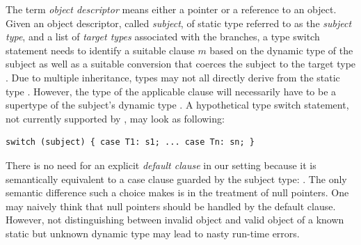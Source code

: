The term \emph{object descriptor} means either a pointer or a reference to 
an object.
Given an object descriptor, called \emph{subject}, of static type  
referred to as the \emph{subject type}, and a list of 
\emph{target types}  associated with the branches, a type switch 
statement needs to identify a suitable clause $m$ based on 
the dynamic type  of the subject as well as a suitable 
conversion that coerces the subject to the target type .  
Due to multiple inheritance, types  may not all directly
derive from the static type . However,
the type of the applicable clause  will necessarily have to be a 
supertype of the subject's dynamic type . 
A hypothetical type switch 
statement, not currently supported by \Cpp{}, may look as following:
%
\begin{lstlisting}[keepspaces]
switch (subject) { case T1: s1; ... case Tn: sn; }
\end{lstlisting}
%
\noindent
There is no need for an explicit \emph{default clause} in our setting because 
it is semantically equivalent to a case clause guarded by the 
subject type: . The only semantic difference such a choice 
makes is in the treatment of null pointers.
One may naively think that null pointers should be handled by
the default clause.  However, not distinguishing between 
invalid object and valid object of a known static but unknown dynamic type may 
lead to nasty run-time errors.

